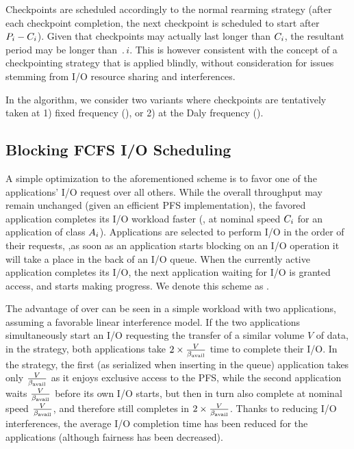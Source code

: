 Checkpoints are scheduled accordingly to the normal rearming strategy
(\ie after each checkpoint completion, the next checkpoint is scheduled
to start after $P_{i}-C_{i}$). Given that checkpoints may actually
last longer than $C_{i}$, the resultant period may be longer than
$\period{i}$. This is however consistent with the concept of a
checkpointing strategy that is applied blindly, without consideration
for issues stemming from I/O resource sharing and interferences.

In the \nocoop algorithm, we consider two variants where checkpoints are
tentatively taken at 1) fixed frequency (\propfixed), or 2) at the
Daly frequency (\propdaly).

\subsection{Blocking \fifoblock FCFS I/O Scheduling}
\label{sec:fcfsblock}

A simple optimization to the aforementioned scheme is to favor one of
the applications' I/O request over all others. While the overall throughput
may remain unchanged (given an efficient PFS implementation), the favored
application completes its I/O workload faster (\ie, at nominal speed
$C_{i}$ for an application of class $A_{i}$).
Applications are selected to perform I/O in the order of their requests,
\ie ,as soon as an application starts blocking on an I/O operation it will
take a place in the back of an  I/O queue. When the currently
active application completes its I/O, the next application waiting for I/O
is granted access, and starts making progress. We denote this scheme as
\fifoblock.

The advantage of \fifoblock over \nocoop can be seen in a simple workload with two
applications, assuming a favorable linear interference model.
If the two applications simultaneously start an I/O requesting the
transfer of a similar volume $V$ of data, in the \nocoop strategy,
both applications take $2 \times \frac{V}{\beta_{\text{avail}}}$ time to complete
their I/O. In the \fifoblock strategy, the first (as serialized when
inserting in the queue) application takes only $\frac{V}{\beta_{\text{avail}}}$
as it enjoys exclusive access to the PFS, while the second application
waits $\frac{V}{\beta_{\text{avail}}}$ before its own I/O starts, but then in turn
also complete at nominal speed $\frac{V}{\beta_{\text{avail}}}$, and therefore still
completes in $2 \times \frac{V}{\beta_{\text{avail}}}$. Thanks
to reducing I/O interferences, the average I/O completion time
has been reduced for the applications (although fairness has been decreased).

